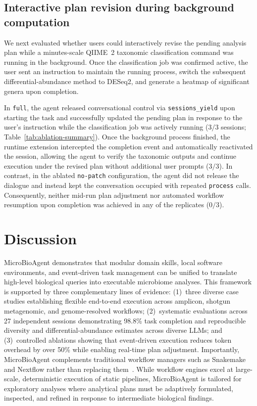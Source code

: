 \documentclass[10pt,letterpaper]{article}
\begin{document}
\subsection{Interactive plan revision during background computation}

We next evaluated whether users could interactively revise the pending
analysis plan while a minutes-scale QIIME~2 taxonomic classification command
was running in the background. Once the classification job was confirmed
active, the user sent an instruction to maintain the running process, switch
the subsequent differential-abundance method to DESeq2, and generate a
heatmap of significant genera upon completion.

In \texttt{full}, the agent released conversational control via
\texttt{sessions\_yield} upon starting the task and successfully updated the
pending plan in response to the user's instruction while the classification
job was actively running ($3/3$ sessions; Table~\ref{tab:ablation-summary}).
Once the background process finished, the runtime extension intercepted the
completion event and automatically reactivated the session, allowing the
agent to verify the taxonomic outputs and continue execution under the
revised plan without additional user prompts ($3/3$). In contrast, in the
ablated \texttt{no-patch} configuration, the agent did not release the
dialogue and instead kept the conversation occupied with repeated
\texttt{process} calls. Consequently, neither mid-run plan adjustment nor
automated workflow resumption upon completion was achieved in any of the
replicates ($0/3$).

\section{Discussion}

MicroBioAgent demonstrates that modular domain skills, local software
environments, and event-driven task management can be unified to translate
high-level biological queries into executable microbiome analyses. This
framework is supported by three complementary lines of evidence: (1)~three
diverse case studies establishing flexible end-to-end execution across
amplicon, shotgun metagenomic, and genome-resolved workflows; (2)~systematic
evaluations across 27 independent sessions demonstrating 98.8\% task
completion and reproducible diversity and differential-abundance estimates
across diverse LLMs; and (3)~controlled ablations showing that event-driven
execution reduces token overhead by over 50\% while enabling real-time plan
adjustment. Importantly, MicroBioAgent complements traditional workflow
managers such as Snakemake and Nextflow rather than replacing
them~\cite{koster2012snakemake,ditommaso2017nextflow}. While workflow engines
excel at large-scale, deterministic execution of static pipelines,
MicroBioAgent is tailored for exploratory analyses where analytical plans
must be adaptively formulated, inspected, and refined in response to
intermediate biological findings.
\end{document}

